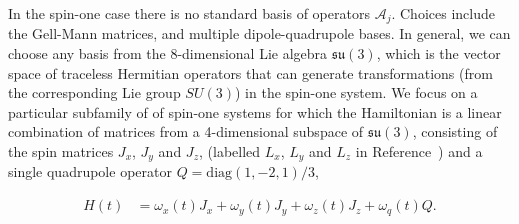\documentclass{jors}
\newcommand{\todo}[1]{\textcolor{green}{\texttt{[TODO: #1]}}}
\begin{document}
		In the spin-one case there is no standard basis of operators $ \mathcal{A}_j $.
		Choices include the Gell-Mann matrices\cite{gell-mann_symmetries_1962}, and multiple dipole-quadrupole bases\cite{hamley_spin-nematic_2012, di_dipolequadrupole_2010}.
		In general, we can choose any basis from the 8-dimensional Lie algebra $ \mathfrak{su}(3) $, which is the vector space of traceless Hermitian operators that can generate transformations (from the corresponding Lie group $ SU(3) $) in the spin-one system.
		We focus on a particular subfamily of of spin-one systems for which the Hamiltonian is a linear combination of matrices from a 4-dimensional subspace of $ \mathfrak{su}(3) $, consisting of the spin matrices $ J_x $, $ J_y $ and $ J_z $, (labelled $ L_x $, $ L_y $ and $ L_z $ in Reference~\cite{hamley_spin-nematic_2012}) and a single quadrupole operator $ Q = \mathrm{diag}(1, -2, 1)/3 $,%


		\begin{align}
			H(t) &= \omega_x(t) J_x + \omega_y(t) J_y + \omega_z(t) J_z + \omega_q(t) Q.
		\end{align}
		
\end{document}
